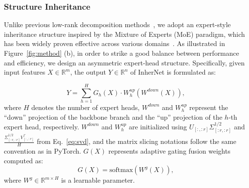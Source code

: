 \documentclass{article} %
\begin{document}

\subsubsection{Structure Inheritance}

Unlike previous low-rank decomposition methods~\citep{jaderberg2014speeding, zhang2015accelerating, zhou2025cuff}, we adopt an expert-style inheritance structure inspired by the Mixture of Experts (MoE) paradigm, which has been widely proven effective across various domains~\citep{tian2024hydralora, gao2024higher, cai2024survey}. As illustrated in Figure~\ref{fig:method} (b), in order to strike a good balance between performance and efficiency, we design an asymmetric expert-head structure. Specifically, given input features $X\in \mathbb{R}^m$, the output $Y\in \mathbb{R}^n$ of InherNet is formulated as:

\begin{equation}
Y = \sum_{h=1}^{H} G_h(X) \cdot W^{up}_h\left(W^{down}(X)\right),
\end{equation}
where \(H\) denotes the number of expert heads, \(W^{down}\) and \(W^{up}_h\) represent the ``down'' projection of the backbone branch and the ``up'' projection of the \(h\)-th expert head, respectively. $W^{down}$ and $W^{up}_h$ are initialized using $U_{[:, :r]}\Sigma_{[:r,:r]}^{1/2}$ and $\frac{\Sigma_{[:r,:r]}^{1/2}V_{[:,:r]}^\top}{H}$ from Eq.~\ref{eq:svd}, and the matrix slicing notations follow the same convention as in PyTorch. \(G(X)\) represents adaptive gating fusion weights computed as:
\begin{equation}
G(X) = \text{softmax}\left(W^g(X)\right),
\end{equation}
where $W^g\in \mathbb{R}^{m\times H}$ is a learnable parameter.

\end{document}
